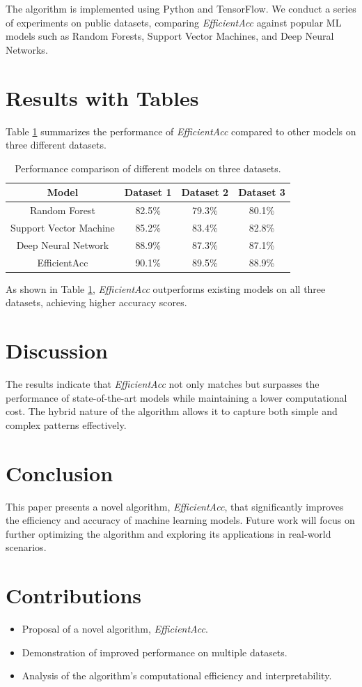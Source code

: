 \documentclass{article}
\begin{document}
The algorithm is implemented using Python and TensorFlow. We conduct a series of experiments on public datasets, comparing \textit{EfficientAcc} against popular ML models such as Random Forests, Support Vector Machines, and Deep Neural Networks.

\section{Results with Tables}
Table \ref{tab:results} summarizes the performance of \textit{EfficientAcc} compared to other models on three different datasets.

\begin{table}[h]
\centering
\begin{tabular}{|c|c|c|c|}
\hline
\textbf{Model} & \textbf{Dataset 1} & \textbf{Dataset 2} & \textbf{Dataset 3} \\
\hline
Random Forest & 82.5\% & 79.3\% & 80.1\% \\
Support Vector Machine & 85.2\% & 83.4\% & 82.8\% \\
Deep Neural Network & 88.9\% & 87.3\% & 87.1\% \\
EfficientAcc & 90.1\% & 89.5\% & 88.9\% \\
\hline
\end{tabular}
\caption{Performance comparison of different models on three datasets.}
\label{tab:results}
\end{table}

As shown in Table \ref{tab:results}, \textit{EfficientAcc} outperforms existing models on all three datasets, achieving higher accuracy scores.

\section{Discussion}
The results indicate that \textit{EfficientAcc} not only matches but surpasses the performance of state-of-the-art models while maintaining a lower computational cost. The hybrid nature of the algorithm allows it to capture both simple and complex patterns effectively.

\section{Conclusion}
This paper presents a novel algorithm, \textit{EfficientAcc}, that significantly improves the efficiency and accuracy of machine learning models. Future work will focus on further optimizing the algorithm and exploring its applications in real-world scenarios.

\section{Contributions}
\begin{itemize}
    \item Proposal of a novel algorithm, \textit{EfficientAcc}.
    \item Demonstration of improved performance on multiple datasets.
    \item Analysis of the algorithm's computational efficiency and interpretability.
\end{itemize}
\end{document}
